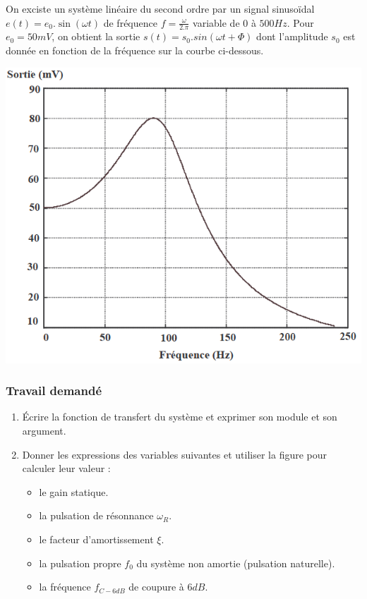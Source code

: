 
On exciste un système linéaire du second ordre par un signal sinusoïdal $e(t)=e_0.\sin(\omega t)$ de fréquence $f=\frac{\omega}{2.\pi}$ variable de $0$ à $500Hz$. Pour $e_0=50mV$, on obtient la sortie $s(t)=s_0.sin(\omega t +\Phi)$ dont l'amplitude $s_0$ est donnée en fonction de la fréquence sur la courbe ci-dessous.

\begin{center}
\includegraphics[scale=0.5]{png/graphe2nd.png}
\end{center}

\subsubsection{Travail demandé}
\begin{enumerate}
\item Écrire la fonction de transfert du système et exprimer son module et son argument.
\item Donner les expressions des variables suivantes et utiliser la figure pour calculer leur valeur :
\begin{itemize}
\item le gain statique.
\item la pulsation de résonnance $\omega_R$.
\item le facteur d'amortissement $\xi$.
\item la pulsation propre $f_0$ du système non amortie (pulsation naturelle).
\item la fréquence $f_{C-6dB}$ de coupure à $6dB$.
\end{itemize}
\end{enumerate}

